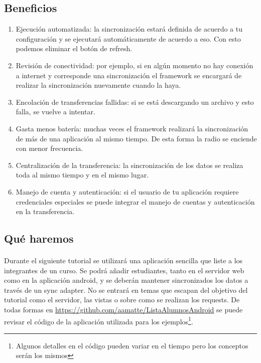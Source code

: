 \documentclass[10pt]{extarticle}
\begin{document}
\subsection{Beneficios}

\begin{enumerate}
 \item Ejecución automatizada: la sincronización estará definida de acuerdo a tu configuración y se ejecutará automáticamente de acuerdo a eso. Con esto podemos eliminar el botón de refresh.
 \item Revisión de conectividad: por ejemplo, si en algún momento no hay conexión a internet y corresponde una sincronización el framework se encargará de realizar la sincronización nuevamente cuando la haya.
 \item Encolación de transferencias fallidas: si se está descargando un archivo y esto falla, se vuelve a intentar.
 \item Gasta menos batería: muchas veces el framework realizará la sincronización de más de una aplicación al mismo tiempo. De esta forma la radio se enciende con menor frecuencia.
 \item Centralización de la transferencia: la sincronización de los datos se realiza toda al mismo tiempo y en el mismo lugar.
 \item Manejo de cuenta y autenticación: si el usuario de tu aplicación requiere credenciales especiales se puede integrar el manejo de cuentas y autenticación en la transferencia.
\end{enumerate}

\subsection{Qué haremos}

\paragraph{}
Durante el siguiente tutorial se utilizará una aplicación sencilla que liste a los integrantes de un curso. Se podrá añadir estudiantes, tanto en el servidor web como en la aplicación android, y se deberán mantener sincronizados los datos a través de un sync adapter. No se entrará en temas que escapan del objetivo del tutorial como el servidor, las vistas o sobre como se realizan los requests. De todas formas en \url{https://github.com/aamatte/ListaAlumnosAndroid} se puede revisar el código de la aplicación utilizada para los ejemplos\footnote{Algunos detalles en el código pueden variar en el tiempo pero los conceptos serán los mismos}.
\end{document}
